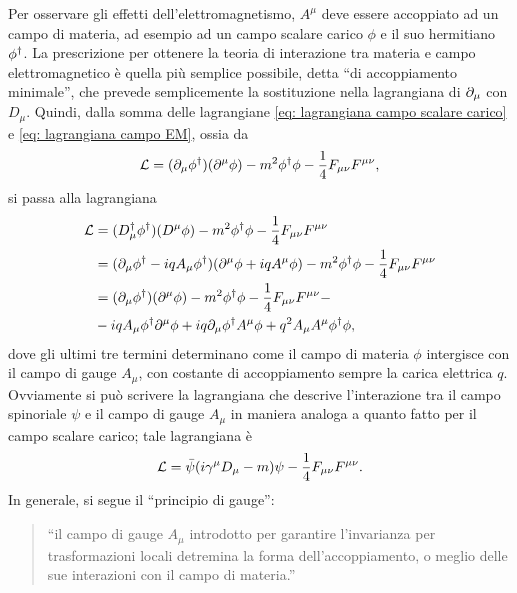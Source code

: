 Per osservare gli effetti dell'elettromagnetismo, $A^\mu$ deve essere accoppiato ad un campo di materia, ad esempio ad un campo scalare carico $\phi$ e il suo hermitiano $\phi^\dagger$. La prescrizione per ottenere la teoria di interazione tra materia e campo elettromagnetico è quella più semplice possibile, detta ``di accoppiamento minimale'', che prevede semplicemente la sostituzione nella lagrangiana di $\partial_\mu$ con $D_\mu$. Quindi, dalla somma delle lagrangiane \eqref{eq: lagrangiana campo scalare carico} e \eqref{eq: lagrangiana campo EM}, ossia da 
\begin{equation}
    \mathcal{L} = (\partial_\mu\phi^\dagger)(\partial^\mu\phi) - m^2\phi^\dagger\phi - \frac{1}{4}F_{\mu\nu}F^{\mu\nu},
\end{equation}
si passa alla lagrangiana
\begin{equation}
\label{eq: lagrangiana campo scalare carico + campo di gauge}
    \begin{split}
        \mathcal{L} &= (D_\mu^\dagger\phi^\dagger)(D^\mu\phi) - m^2\phi^\dagger\phi - \frac{1}{4}F_{\mu\nu}F^{\mu\nu} \\
        &= (\partial_\mu\phi^\dagger - iqA_\mu\phi^\dagger)(\partial^\mu\phi + iqA^\mu\phi) - m^2\phi^\dagger\phi - \frac{1}{4}F_{\mu\nu}F^{\mu\nu} \\
        &= (\partial_\mu\phi^\dagger)(\partial^\mu\phi) - m^2\phi^\dagger\phi - \frac{1}{4}F_{\mu\nu}F^{\mu\nu} - \\
        &- iqA_\mu\phi^\dagger\partial^\mu\phi + iq\partial_\mu\phi^\dagger A^\mu\phi + q^2A_\mu A^\mu\phi^\dagger\phi,
    \end{split}
\end{equation}
dove gli ultimi tre termini determinano come il campo di materia $\phi$ intergisce con il campo di gauge $A_\mu$, con costante di accoppiamento sempre la carica elettrica $q$. Ovviamente si può scrivere la lagrangiana che descrive l'interazione tra il campo spinoriale $\psi$ e il campo di gauge $A_\mu$ in maniera analoga a quanto fatto per il campo scalare carico; tale lagrangiana è
\begin{equation}
\label{eq: lagrangiana campo spinoriale + campo di gauge}
    \mathcal{L} = \bar{\psi}(i\gamma^\mu D_\mu - m)\psi - \frac{1}{4}F_{\mu\nu}F^{\mu\nu}.
\end{equation}
In generale, si segue il ``principio di gauge'':
\begin{quote}
    ``il campo di gauge $A_\mu$ introdotto per garantire l'invarianza per trasformazioni locali detremina la forma dell'accoppiamento, o meglio delle sue interazioni con il campo di materia.''
\end{quote}

